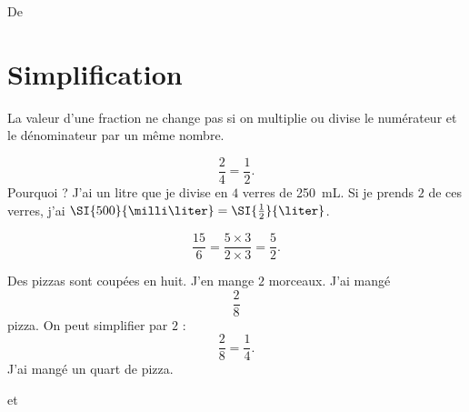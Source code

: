 

De \cite{NRHooXFvgpp5}

\section{Simplification}

\begin{Aretenir}
    La valeur d'une fraction ne change pas si on multiplie ou divise le numérateur et le dénominateur par un même nombre.
\end{Aretenir}

\begin{example}
    \begin{equation}
        \frac{ 2 }{ 4 }=\frac{ 1 }{2}.
    \end{equation}
    Pourquoi ? J'ai un litre que je divise en \( 4\) verres de \SI{250}{\milli\liter}. Si je prends \( 2\) de ces verres, j'ai \( \SI{500}{\milli\liter}=\SI{\frac{ 1 }{2}}{\liter}\).
\end{example}

\begin{example}
    \begin{equation}
        \frac{ 15 }{ 6 }=\frac{ 5\times 3 }{ 2\times 3 }=\frac{ 5 }{ 2 }.
    \end{equation}
\end{example}

\begin{example}
    Des pizzas sont coupées en huit. J'en mange \( 2\) morceaux. J'ai mangé
    \begin{equation}
        \frac{ 2 }{ 8 }
    \end{equation}
    pizza. On peut simplifier par \( 2\) :
    \begin{equation}
        \frac{ 2 }{ 8 }=\frac{1}{ 4 }.
    \end{equation}
    J'ai mangé un quart de pizza.


\begin{center}
   
\end{center}

et

\begin{center}
   
\end{center}


\end{example}


